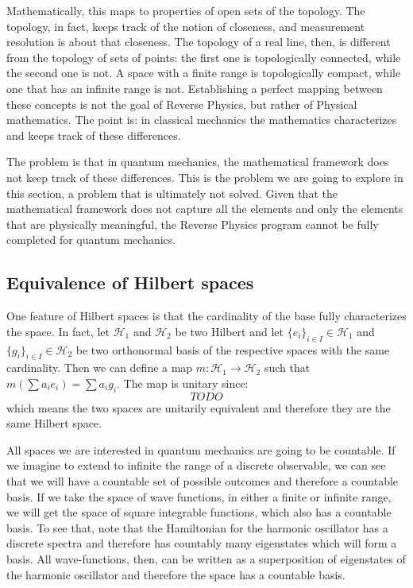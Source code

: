 Mathematically, this maps to properties of open sets of the topology. The topology, in fact, keeps track of the notion of closeness, and measurement resolution is about that closeness. The topology of a real line, then, is different from the topology of sets of points: the first one is topologically connected, while the second one is not. A space with a finite range is topologically compact, while one that has an infinite range is not. Establishing a perfect mapping between these concepts is not the goal of Reverse Physics, but rather of Physical mathematics. The point is: in classical mechanics the mathematics characterizes and keeps track of these differences.

The problem is that in quantum mechanics, the mathematical framework does not keep track of these differences. This is the problem we are going to explore in this section, a problem that is ultimately not solved. Given that the mathematical framework does not capture all the elements and only the elements that are physically meaningful, the Reverse Physics program cannot be fully completed for quantum mechanics.

\subsection{Equivalence of Hilbert spaces}

One feature of Hilbert spaces is that the cardinality of the base fully characterizes the space. In fact, let $\mathcal{H}_1$ and $\mathcal{H}_2$ be two Hilbert and let $\{e_i\}_{i \in I} \in \mathcal{H}_1$ and $\{g_i\}_{i \in I} \in \mathcal{H}_2$ be two orthonormal basis of the respective spaces with the same cardinality. Then we can define a map $m : \mathcal{H}_1 \to \mathcal{H}_2$ such that $m(\sum a_i e_i) = \sum a_i g_i$. The map is unitary since:
\begin{equation}
	TODO
\end{equation}
which means the two spaces are unitarily equivalent and therefore they are the same Hilbert space.

All spaces we are interested in quantum mechanics are going to be countable. If we imagine to extend to infinite the range of a discrete observable, we can see that we will have a countable set of possible outcomes and therefore a countable basis. If we take the space of wave functions, in either a finite or infinite range, we will get the space of square integrable functions, which also has a countable basis. To see that, note that the Hamiltonian for the harmonic oscillator has a discrete spectra and therefore has countably many eigenstates which will form a basis. All wave-functions, then, can be written as a superposition of eigenstates of the harmonic oscillator and therefore the space has a countable basis.

